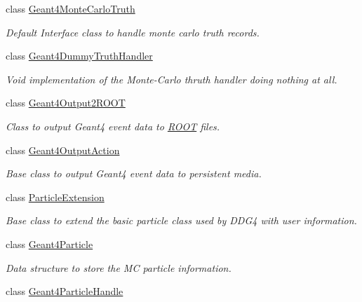 \begin{DoxyCompactItemize}
class \hyperlink{class_d_d4hep_1_1_simulation_1_1_geant4_monte_carlo_truth}{Geant4MonteCarloTruth}
\begin{DoxyCompactList}\small\item\em Default Interface class to handle monte carlo truth records. \item\end{DoxyCompactList}\item 
class \hyperlink{class_d_d4hep_1_1_simulation_1_1_geant4_dummy_truth_handler}{Geant4DummyTruthHandler}
\begin{DoxyCompactList}\small\item\em Void implementation of the Monte-\/Carlo thruth handler doing nothing at all. \item\end{DoxyCompactList}\item 
class \hyperlink{class_d_d4hep_1_1_simulation_1_1_geant4_output2_r_o_o_t}{Geant4Output2ROOT}
\begin{DoxyCompactList}\small\item\em Class to output Geant4 event data to \hyperlink{namespace_r_o_o_t}{ROOT} files. \item\end{DoxyCompactList}\item 
class \hyperlink{class_d_d4hep_1_1_simulation_1_1_geant4_output_action}{Geant4OutputAction}
\begin{DoxyCompactList}\small\item\em Base class to output Geant4 event data to persistent media. \item\end{DoxyCompactList}\item 
class \hyperlink{class_d_d4hep_1_1_simulation_1_1_particle_extension}{ParticleExtension}
\begin{DoxyCompactList}\small\item\em Base class to extend the basic particle class used by DDG4 with user information. \item\end{DoxyCompactList}\item 
class \hyperlink{class_d_d4hep_1_1_simulation_1_1_geant4_particle}{Geant4Particle}
\begin{DoxyCompactList}\small\item\em Data structure to store the MC particle information. \item\end{DoxyCompactList}\item 
class \hyperlink{class_d_d4hep_1_1_simulation_1_1_geant4_particle_handle}{Geant4ParticleHandle}

\end{DoxyCompactItemize}
